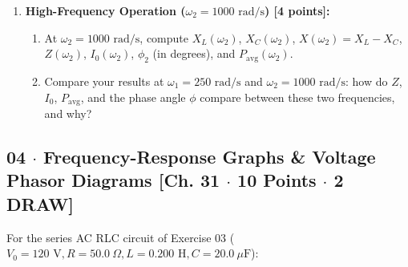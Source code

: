 \documentclass[10pt,letterpaper]{article}
\begin{document}
{{{\begin{enumerate}
  \item \textbf{High-Frequency Operation ($\omega_2 = 1000\text{ rad/s}$) [4 points]:}
    \begin{enumerate}
      \item At $\omega_2 = 1000\text{ rad/s}$, compute $X_L(\omega_2)$, $X_C(\omega_2)$, $X(\omega_2) = X_L - X_C$, $Z(\omega_2)$, $I_0(\omega_2)$, $\phi_2$ (in degrees), and $P_{\text{avg}}(\omega_2)$.
      \item Compare your results at $\omega_1 = 250\text{ rad/s}$ and $\omega_2 = 1000\text{ rad/s}$: how do $Z$, $I_0$, $P_{\text{avg}}$, and the phase angle $\phi$ compare between these two frequencies, and why?
    \end{enumerate}
  
\end{enumerate}
\vspace{1.2in}


\newpage



\subsection*{04 $\cdot$ Frequency-Response Graphs \& Voltage Phasor Diagrams \hfill [Ch. 31 $\cdot$ 10 Points $\cdot$ 2 DRAW]}

For the series AC RLC circuit of Exercise 03 ($V_0 = 120\text{ V}, R = 50.0\ \Omega, L = 0.200\text{ H}, C = 20.0\ \mu\text{F}$):

}}}
\end{document}
